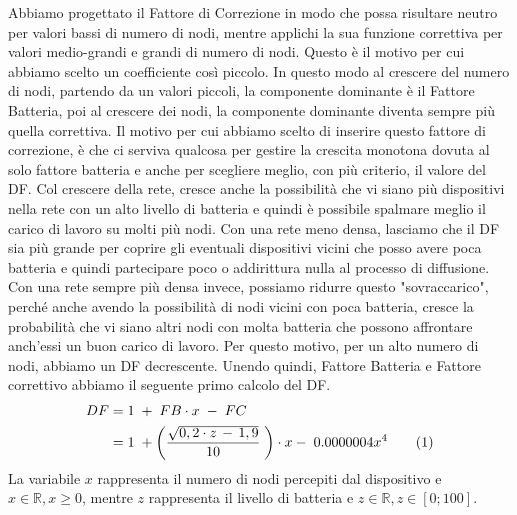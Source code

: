 Abbiamo progettato il Fattore di Correzione in modo che possa risultare neutro per valori bassi di numero di nodi, mentre applichi la sua funzione correttiva per valori medio-grandi e grandi di numero di nodi. Questo è il motivo per cui abbiamo scelto un coefficiente così piccolo. In questo modo al crescere del numero di nodi, partendo da un valori piccoli, la componente dominante è il Fattore Batteria, poi al crescere dei nodi, la componente dominante diventa sempre più quella correttiva. Il motivo per cui abbiamo scelto di inserire questo fattore di correzione, è che ci serviva qualcosa per gestire la crescita monotona dovuta al solo fattore batteria e anche per scegliere meglio, con più criterio, il valore del DF. Col crescere della rete, cresce anche la possibilità che vi siano più dispositivi nella rete con un alto livello di batteria e quindi è possibile spalmare meglio il carico di lavoro su molti più nodi. Con una rete meno densa, lasciamo che il DF sia più grande per coprire gli eventuali dispositivi vicini che posso avere poca batteria e quindi partecipare poco o addirittura nulla al processo di diffusione. Con una rete sempre più densa invece, possiamo ridurre questo "sovraccarico", perché anche avendo la possibilità di nodi vicini con poca batteria, cresce la probabilità che vi siano altri nodi con molta batteria che possono affrontare anch'essi un buon carico di lavoro. Per questo motivo, per un alto numero di nodi, abbiamo un DF decrescente.
Unendo quindi, Fattore Batteria e Fattore correttivo abbiamo il seguente primo calcolo del DF.
\begin{align*}
	\label{eq:DF_no_asint}
	DF &= 1 \; + \; FB\cdot x \; - \; FC\\
	&= 1 \; + \left( \dfrac{\sqrt{0,2\cdot z\,-\,1,9}}{10}\; \right) \cdot x- \; 0.0000004x^4 \addtocounter{equation}{1}\tag{\theequation}
\end{align*}
La variabile $\textit{x}$ rappresenta il numero di nodi percepiti dal dispositivo e $ \textit{x}\in\mathbb{R},x\geq0$, mentre $\textit{z}$ rappresenta il livello di batteria e $\textit{z}\in \mathbb{R}, \textit{z}\in[0;100]$.

